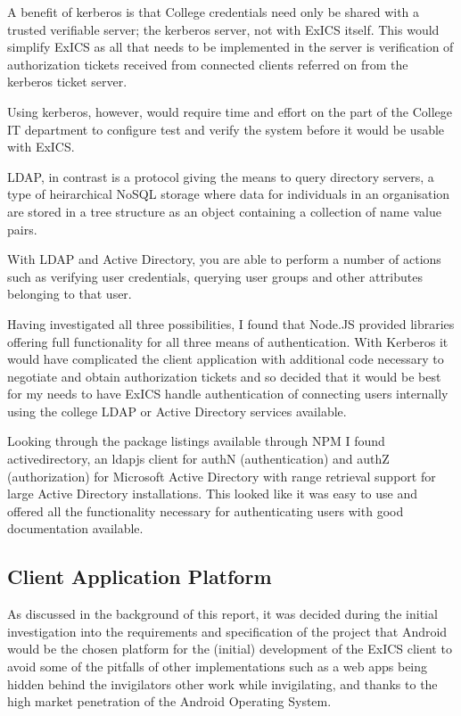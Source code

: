 A benefit of kerberos is that College credentials need only be shared with a trusted verifiable server; the kerberos server, not with ExICS itself.  This would simplify ExICS as all that needs to be implemented in the server is verification of authorization tickets received from connected clients referred on from the kerberos ticket server.

Using kerberos, however, would require time and effort on the part of the College IT department to configure test and verify the system before it would be usable with ExICS.

LDAP, in contrast is a protocol giving the means to query directory servers, a type of heirarchical NoSQL storage where data for individuals in an organisation are stored in a tree structure as an object containing a collection of name value pairs.

With LDAP and Active Directory, you are able to perform a number of actions such as verifying user credentials, querying user groups and other attributes belonging to that user.

Having investigated all three possibilities, I found that Node.JS provided libraries offering full functionality for all three means of authentication.  With Kerberos it would have complicated the client application with additional code necessary to negotiate and obtain authorization tickets and so decided that it would be best for my needs to have ExICS handle authentication of connecting users internally using the college LDAP or Active Directory services available.

Looking through the package listings available through NPM I found activedirectory, an ldapjs client for authN (authentication) and authZ (authorization) for Microsoft Active Directory with range retrieval support for large Active Directory installations.\cite{activedirectory}  This looked like it was easy to use and offered all the functionality necessary for authenticating users with good documentation available.

\subsection{Client Application Platform}

As discussed in the background of this report, it was decided during the initial investigation into the requirements and specification of the project that Android would be the chosen platform for the (initial) development of the ExICS client to avoid some of the pitfalls of other implementations such as a web apps being hidden behind the invigilators other work while invigilating, and thanks to the high market penetration of the Android Operating System.

